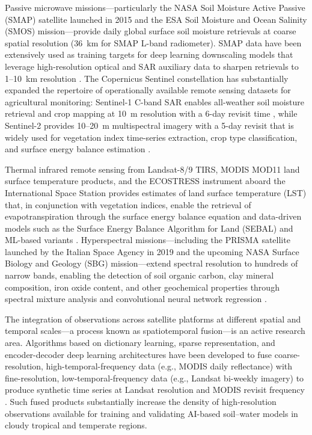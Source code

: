 \documentclass[land,article,submit,pdftex,moreauthors]{Definitions/mdpi}
\numberwithin{equation}{section}
\begin{document}
Passive microwave missions---particularly the NASA Soil Moisture Active Passive (SMAP) satellite launched in 2015 and the ESA Soil Moisture and Ocean Salinity (SMOS) mission---provide daily global surface soil moisture retrievals at coarse spatial resolution (36~km for SMAP L-band radiometer). SMAP data have been extensively used as training targets for deep learning downscaling models that leverage high-resolution optical and SAR auxiliary data to sharpen retrievals to 1--10~km resolution \citep{fang2019deep}. The Copernicus Sentinel constellation has substantially expanded the repertoire of operationally available remote sensing datasets for agricultural monitoring: Sentinel-1 C-band SAR enables all-weather soil moisture retrieval and crop mapping at 10~m resolution with a 6-day revisit time \citep{hajj2017soil}, while Sentinel-2 provides 10--20~m multispectral imagery with a 5-day revisit that is widely used for vegetation index time-series extraction, crop type classification, and surface energy balance estimation \citep{Lemenkova202405}.

Thermal infrared remote sensing from Landsat-8/9 TIRS, MODIS MOD11 land surface temperature products, and the ECOSTRESS instrument aboard the International Space Station provides estimates of land surface temperature (LST) that, in conjunction with vegetation indices, enable the retrieval of evapotranspiration through the surface energy balance equation and data-driven models such as the Surface Energy Balance Algorithm for Land (SEBAL) and ML-based variants \citep{allen1998crop, song2022deep, Lemenkova202221}. Hyperspectral missions---including the PRISMA satellite launched by the Italian Space Agency in 2019 and the upcoming NASA Surface Biology and Geology (SBG) mission---extend spectral resolution to hundreds of narrow bands, enabling the detection of soil organic carbon, clay mineral composition, iron oxide content, and other geochemical properties through spectral mixture analysis and convolutional neural network regression \citep{hong2021multimodal}.

The integration of observations across satellite platforms at different spatial and temporal scales---a process known as spatiotemporal fusion---is an active research area. Algorithms based on dictionary learning, sparse representation, and encoder-decoder deep learning architectures have been developed to fuse coarse-resolution, high-temporal-frequency data (e.g., MODIS daily reflectance) with fine-resolution, low-temporal-frequency data (e.g., Landsat bi-weekly imagery) to produce synthetic time series at Landsat resolution and MODIS revisit frequency \citep{gao2017blending}. Such fused products substantially increase the density of high-resolution observations available for training and validating AI-based soil--water models in cloudy tropical and temperate regions.
\end{document}
